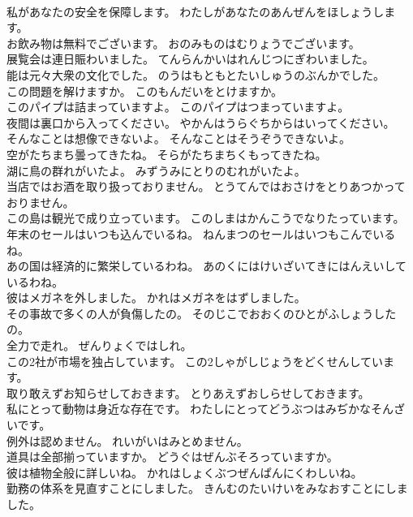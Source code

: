 \documentclass[8pt]{extreport}
\begin{document}
\begin{CJK}{UTF8}{min}
\\	私があなたの安全を保障します。	わたしがあなたのあんぜんをほしょうします。 
\\	お飲み物は無料でございます。	おのみものはむりょうでございます。 
\\	展覧会は連日賑わいました。	てんらんかいはれんじつにぎわいました。 
\\	能は元々大衆の文化でした。	のうはもともとたいしゅうのぶんかでした。 
\\	この問題を解けますか。	このもんだいをとけますか。 
\\	このパイプは詰まっていますよ。	このパイプはつまっていますよ。 
\\	夜間は裏口から入ってください。	やかんはうらぐちからはいってください。 
\\	そんなことは想像できないよ。	そんなことはそうぞうできないよ。 
\\	空がたちまち曇ってきたね。	そらがたちまちくもってきたね。 
\\	湖に鳥の群れがいたよ。	みずうみにとりのむれがいたよ。 
\\	当店ではお酒を取り扱っておりません。	とうてんではおさけをとりあつかっておりません。 
\\	この島は観光で成り立っています。	このしまはかんこうでなりたっています。 
\\	年末のセールはいつも込んでいるね。	ねんまつのセールはいつもこんでいるね。 
\\	あの国は経済的に繁栄しているわね。	あのくにはけいざいてきにはんえいしているわね。 
\\	彼はメガネを外しました。	かれはメガネをはずしました。 
\\	その事故で多くの人が負傷したの。	そのじこでおおくのひとがふしょうしたの。 
\\	全力で走れ。	ぜんりょくではしれ。 
\\	この2社が市場を独占しています。	この2しゃがしじょうをどくせんしています。 
\\	取り敢えずお知らせしておきます。	とりあえずおしらせしておきます。 
\\	私にとって動物は身近な存在です。	わたしにとってどうぶつはみぢかなそんざいです。 
\\	例外は認めません。	れいがいはみとめません。 
\\	道具は全部揃っていますか。	どうぐはぜんぶそろっていますか。 
\\	彼は植物全般に詳しいね。	かれはしょくぶつぜんぱんにくわしいね。 
\\	勤務の体系を見直すことにしました。	きんむのたいけいをみなおすことにしました。 

\end{CJK}
\end{document}
